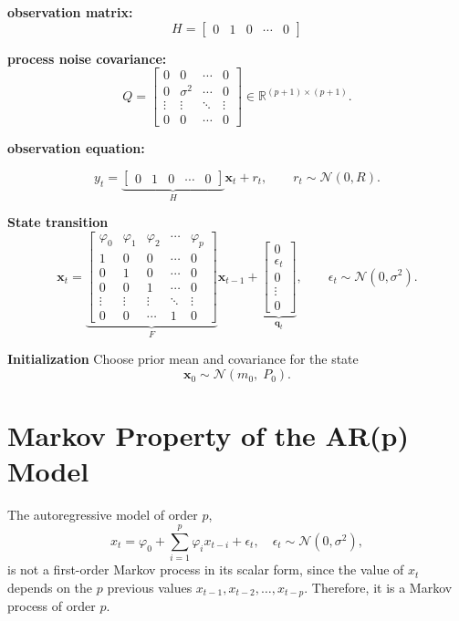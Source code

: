 \textbf{observation matrix:}
\[
H =
\begin{bmatrix}
0 & 1 & 0 & \cdots & 0
\end{bmatrix}
\]

\textbf{process noise covariance:}
\[
Q =
\begin{bmatrix}
0 & 0 & \cdots & 0 \\
0 & \sigma^2 & \cdots & 0 \\
\vdots & \vdots & \ddots & \vdots \\
0 & 0 & \cdots & 0
\end{bmatrix}
\in \mathbb{R}^{(p+1)\times(p+1)}.
\]

\textbf{observation equation:}

\[
y_t =
\underbrace{\begin{bmatrix}
0 & 1 & 0 & \cdots & 0
\end{bmatrix}}_{\displaystyle H}
\mathbf{x}_t + r_t,
\qquad
r_t \sim \mathcal{N}(0,R).
\]

\textbf{State transition}
\[
\mathbf{x}_t =
\underbrace{
\begin{bmatrix}
\varphi_0 & \varphi_1 & \varphi_2 & \cdots & \varphi_p \\
1 & 0 & 0 & \cdots & 0 \\
0 & 1 & 0 & \cdots & 0 \\
0 & 0 & 1 & \cdots & 0 \\
\vdots & \vdots & \vdots & \ddots & \vdots \\
0 & 0 & \cdots & 1& 0 
\end{bmatrix}
}_{\displaystyle F}
\mathbf{x}_{t-1}
+
\underbrace{
\begin{bmatrix}
0 \\
\epsilon_t \\
0 \\
\vdots \\
0
\end{bmatrix}
}_{\displaystyle \mathbf{q}_t},
\qquad \epsilon_t \sim \mathcal{N}(0,\sigma^2).
\]



\textbf{Initialization}
Choose prior mean and covariance for the state
\[
\mathbf{x}_0 \sim \mathcal{N}(m_0,\; P_0).
\]


\section*{Markov Property of the AR(p) Model} %

The autoregressive model of order \(p\),
\[
x_t = \varphi_0 + \sum_{i=1}^{p} \varphi_i x_{t-i} + \epsilon_t,
\quad \epsilon_t \sim \mathcal{N}(0, \sigma^2),
\]
is not a first-order Markov process in its scalar form, since the value of \(x_t\) depends on the \(p\) previous values \(x_{t-1}, x_{t-2}, \dots, x_{t-p}\). Therefore, it is a Markov process of order \(p\).

